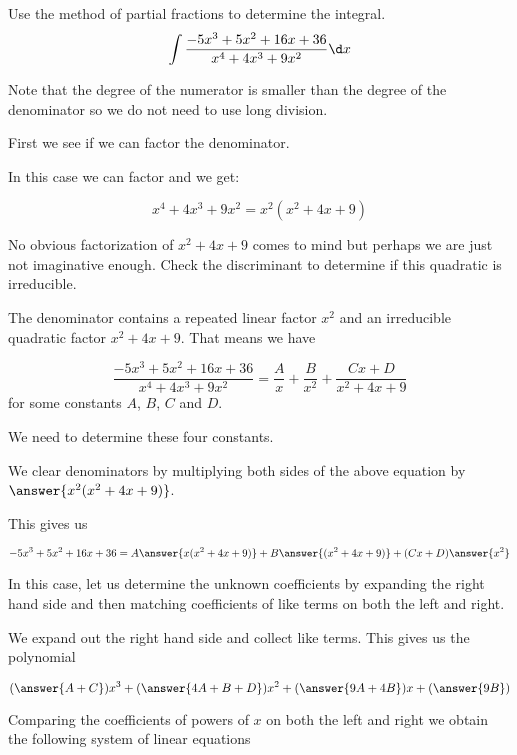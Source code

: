 \documentclass{ximera}
\author{Jim Talamo and Jason Miller}
\begin{document}
\begin{exercise}
Use the method of partial fractions to determine the integral.
\[
\int \frac{-5x^{3}+5x^{2}+16x+36}{x^{4}+4x^{3}+9x^{2}} \d x
\]

Note that the degree of the numerator is smaller than the degree of the denominator so we do not need 
to use long division. 

First we see if we can factor the denominator. 

In this case we can factor and we get:

\[
x^{4}+4x^{3}+9x^{2}=x^{2}(x^{2}+4x+9)
\]

No obvious factorization of $x^{2}+4x+9$ comes to mind but perhaps we are just not imaginative enough. 
Check the discriminant to determine if this quadratic is irreducible. 


  \begin{multipleChoice}
  \end{multipleChoice}

\begin{exercise} 

The denominator contains a repeated linear factor $x^{2}$ and an irreducible quadratic factor $x^{2}+4x+9$. 
That means we have

\[
 \frac{-5x^{3}+5x^{2}+16x+36}{x^{4}+4x^{3}+9x^{2}}= \frac{A}{x} + \frac{B}{x^{2}} +\frac{Cx+D}{x^{2}+4x+9}
\]
for some constants $A$, $B$, $C$ and $D$.

We need to determine these four constants. 

We clear denominators by multiplying both sides of the above equation by $\answer{x^{2}(x^{2}+4x+9)}$. 

This gives us 

\[
-5x^{3}+5x^{2}+16x+36=A\answer{ x(x^{2}+4x+9)} + B\answer{ (x^{2}+4x+9)} +  (Cx+D)\answer{x^{2}}
\]

In this case, let us determine the unknown coefficients by expanding the right hand side and then matching coefficients of like terms on both the left and right. 

We expand out the right hand side and collect like terms. This gives us the polynomial

\[
(\answer{A+C})x^{3}+(\answer{4A+B+D})x^{2}+(\answer{9A+4B})x+(\answer{9B})
\]


\begin{exercise}

Comparing the coefficients of powers of $x$ on both the left and right we obtain the following system of linear equations


\end{exercise}
\end{exercise}
\end{exercise}
\end{document}
